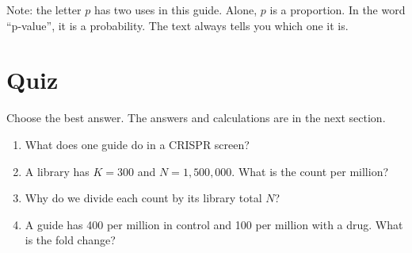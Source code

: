 \documentclass[12pt]{article}
\begin{document}
Note: the letter $p$ has two uses in this guide. Alone, $p$ is a proportion.
In the word ``p-value'', it is a probability. The text always tells you
which one it is.

\newpage
\section{Quiz}

Choose the best answer. The answers and calculations are in the next
section.

\begin{enumerate}[label=\textbf{Q\arabic*.},leftmargin=2.6em,itemsep=6pt]

\item What does one guide do in a CRISPR screen?

\item A library has $K = 300$ and $N = 1{,}500{,}000$. What is the count per
million?

\item Why do we divide each count by its library total $N$?

\item A guide has 400 per million in control and 100 per million with a
drug. What is the fold change?


\end{enumerate}
\end{document}
